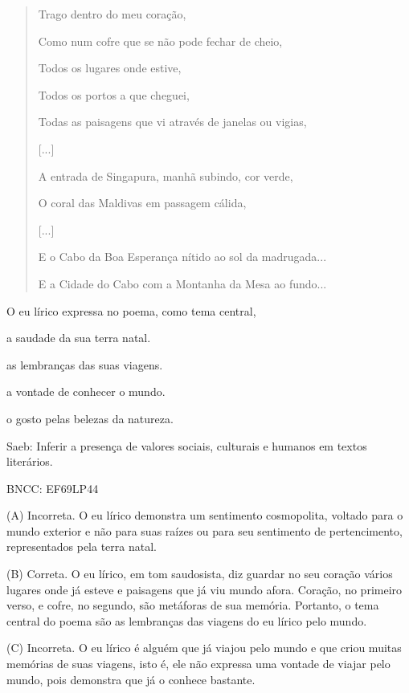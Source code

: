 \begin{quote}
Trago dentro do meu coração,

Como num cofre que se não pode fechar de cheio,

Todos os lugares onde estive,

Todos os portos a que cheguei,

Todas as paisagens que vi através de janelas ou vigias,

{[}...{]}

A entrada de Singapura, manhã subindo, cor verde,

O coral das Maldivas em passagem cálida,

{[}...{]}

E o Cabo da Boa Esperança nítido ao sol da madrugada...

E a Cidade do Cabo com a Montanha da Mesa ao fundo...
\end{quote}

O eu lírico expressa no poema, como tema central,

\begin{escolha}
\item a saudade da sua terra natal.

\item as lembranças das suas viagens.

\item a vontade de conhecer o mundo.

\item o gosto pelas belezas da natureza.
\end{escolha}

Saeb: Inferir a presença de valores sociais, culturais e humanos em
textos literários.

BNCC: EF69LP44

(A) Incorreta. O eu lírico demonstra um sentimento cosmopolita, voltado
para o mundo exterior e não para suas raízes ou para seu sentimento de
pertencimento, representados pela terra natal.

(B) Correta. O eu lírico, em tom saudosista, diz guardar no seu coração
vários lugares onde já esteve e paisagens que já viu mundo afora.
Coração, no primeiro verso, e cofre, no segundo, são metáforas de sua
memória. Portanto, o tema central do poema são as lembranças das viagens
do eu lírico pelo mundo.

(C) Incorreta. O eu lírico é alguém que já viajou pelo mundo e que criou
muitas memórias de suas viagens, isto é, ele não expressa uma vontade de
viajar pelo mundo, pois demonstra que já o conhece bastante.

